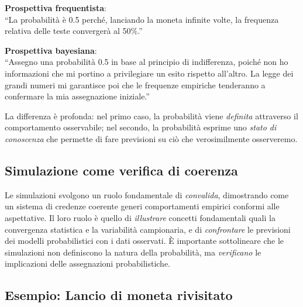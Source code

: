 \documentclass[
  letterpaper,
  DIV=11,
  numbers=noendperiod,
  oneside]{scrreprt}
\theoremstyle{definition}
\theoremstyle{plain}
\theoremstyle{definition}
\theoremstyle{remark}
\begin{document}
\begin{tcolorbox}[enhanced jigsaw, arc=.35mm, breakable, colbacktitle=quarto-callout-important-color!10!white, opacityback=0, toprule=.15mm, rightrule=.15mm, colback=white, opacitybacktitle=0.6, leftrule=.75mm, coltitle=black, bottomtitle=1mm, left=2mm, toptitle=1mm, title=\textcolor{quarto-callout-important-color}{\faExclamation}\hspace{0.5em}{Differenza filosofica fondamentale}, titlerule=0mm, bottomrule=.15mm, colframe=quarto-callout-important-color-frame]

\textbf{Prospettiva frequentista}:\\
``La probabilità è 0.5 perché, lanciando la moneta infinite volte, la
frequenza relativa delle teste convergerà al 50\%.''

\textbf{Prospettiva bayesiana}:\\
``Assegno una probabilità 0.5 in base al principio di indifferenza,
poiché non ho informazioni che mi portino a privilegiare un esito
rispetto all'altro. La legge dei grandi numeri mi garantisce poi che le
frequenze empiriche tenderanno a confermare la mia assegnazione
iniziale.''

La differenza è profonda: nel primo caso, la probabilità viene
\emph{definita} attraverso il comportamento osservabile; nel secondo, la
probabilità esprime uno \emph{stato di conoscenza} che permette di fare
previsioni su ciò che verosimilmente osserveremo.

\end{tcolorbox}

\subsection{Simulazione come verifica di
coerenza}\label{simulazione-come-verifica-di-coerenza}

Le simulazioni svolgono un ruolo fondamentale di \emph{convalida},
dimostrando come un sistema di credenze coerente generi comportamenti
empirici conformi alle aspettative. Il loro ruolo è quello di
\emph{illustrare} concetti fondamentali quali la convergenza statistica
e la variabilità campionaria, e di \emph{confrontare} le previsioni dei
modelli probabilistici con i dati osservati. È importante sottolineare
che le simulazioni non definiscono la natura della probabilità, ma
\emph{verificano} le implicazioni delle assegnazioni probabilistiche.

\subsection{Esempio: Lancio di moneta
rivisitato}\label{esempio-lancio-di-moneta-rivisitato}
\end{document}
